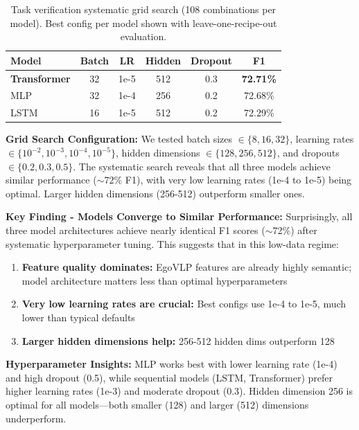 \documentclass[10pt,twocolumn,letterpaper]{article}
\newcommand{\tighttabcolsep}{\setlength{\tabcolsep}{3pt}}
\newcommand{\tighttablerowstretch}{\renewcommand{\arraystretch}{1.05}}
\begin{document}
\begin{table}[h]
\centering
\caption{Task verification systematic grid search (108 combinations per model). Best config per model shown with leave-one-recipe-out evaluation.}
\label{tab:verification}
{\scriptsize\tighttabcolsep\tighttablerowstretch
\begin{tabular}{lccccc}
\toprule
Model & Batch & LR & Hidden & Dropout & F1 \\
\midrule
\textbf{Transformer} & 32 & 1e-5 & 512 & 0.3 & \textbf{72.71\%} \\
MLP & 32 & 1e-4 & 256 & 0.2 & 72.68\% \\
LSTM & 16 & 1e-5 & 512 & 0.2 & 72.29\% \\
\bottomrule
\end{tabular}
}
\end{table}

\textbf{Grid Search Configuration:} We tested batch sizes $\in \{8, 16, 32\}$, learning rates $\in \{10^{-2}, 10^{-3}, 10^{-4}, 10^{-5}\}$, hidden dimensions $\in \{128, 256, 512\}$, and dropouts $\in \{0.2, 0.3, 0.5\}$. The systematic search reveals that all three models achieve similar performance ($\sim$72\% F1), with very low learning rates (1e-4 to 1e-5) being optimal. Larger hidden dimensions (256-512) outperform smaller ones.

\textbf{Key Finding - Models Converge to Similar Performance:} Surprisingly, all three model architectures achieve nearly identical F1 scores ($\sim$72\%) after systematic hyperparameter tuning. This suggests that in this low-data regime:
\begin{enumerate}
    \item \textbf{Feature quality dominates:} EgoVLP features are already highly semantic; model architecture matters less than optimal hyperparameters
    \item \textbf{Very low learning rates are crucial:} Best configs use 1e-4 to 1e-5, much lower than typical defaults
    \item \textbf{Larger hidden dimensions help:} 256-512 hidden dims outperform 128
\end{enumerate}

\textbf{Hyperparameter Insights:} MLP works best with lower learning rate (1e-4) and high dropout (0.5), while sequential models (LSTM, Transformer) prefer higher learning rates (1e-3) and moderate dropout (0.3). Hidden dimension 256 is optimal for all models---both smaller (128) and larger (512) dimensions underperform.
\end{document}
